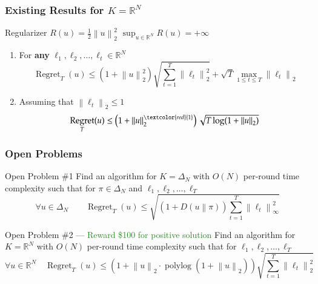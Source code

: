 \documentclass[usenames,dvipsnames]{beamer}
\DeclareMathOperator{\Regret}{Regret}
\DeclareMathOperator{\polylog}{polylog}
\newcommand{\R}{\mathbb{R}}
\newcommand{\norm}[1]{\left\|#1\right\|}
\newcommand{\KL}[2]{D\left({#1}\middle\|{#2}\right)}
\newcommand{\Cite}[1]{{\tiny \textcolor{Blue}{[#1]}}}
\begin{document}
\begin{frame}
\frametitle{Existing Results for $K=\R^N$}

Regularizer $R(u) = \frac{1}{2}\norm{u}_2^2$ \qquad $\sup_{u \in \R^N} R(u) = +\infty$

\vspace{1cm}

\begin{enumerate}

\item For \textbf{any} $\ell_1, \ell_2, \dots, \ell_t \in \R^N$ \qquad \Cite{OP'15}
$$
\Regret_T(u) \le \left( 1+\norm{u}_2^2 \right) \sqrt{\sum_{t=1}^T \norm{\ell_t}_2^2} + \sqrt{T} \max_{1 \le t \le T} \norm{\ell_t}_2
$$

\item Assuming that $\norm{\ell_t}_2 \le 1$ \qquad \Cite{SM'12, O'13, MA'13, MO'14, O'14, OP'16}
$$
\Regret_T(u) \le \left( 1 + \norm{u}_2^{\textcolor{red}{1}} \right) \sqrt{T \log(1+\norm{u}_2)}
$$
\end{enumerate}
\end{frame}

\begin{frame}
\frametitle{Open Problems}

\begin{block}{Open Problem \#1}
Find an algorithm for $K=\Delta_N$ with $O(N)$ per-round time complexity
such that for  $\pi \in \Delta_N$ and $\ell_1, \ell_2, \dots, \ell_T$
$$
\forall u \in \Delta_N \qquad
\Regret_T(u) \le \sqrt{\left(1 + \KL{u}{\pi}\right) \sum_{t=1}^T \norm{\ell_t}_\infty^2}
$$
\end{block}

\begin{block}{Open Problem \#2 --- \textcolor{ForestGreen}{Reward \$100 for positive solution}}
Find an algorithm for $K=\R^N$ with $O(N)$ per-round time complexity
such that for  $\ell_1, \ell_2, \dots, \ell_T$
$$
\forall u \in \R^N \quad
\Regret_T(u) \le (1 + \norm{u}_2 \cdot \polylog(1+\norm{u}_2)) \sqrt{\sum_{t=1}^T \norm{\ell_t}_2^2}
$$
\end{block}
\end{frame}
\end{document}
